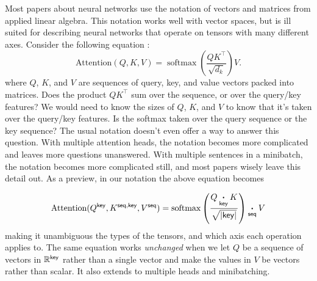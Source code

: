 \documentclass{article}
\DeclareMathOperator*{\softmax}{softmax}
\begin{document}
Most papers about neural networks use the notation of vectors and matrices from applied linear algebra.  This notation works well with vector spaces, but is ill suited for describing neural networks that operate on tensors with many different axes. Consider the following equation \citep{vaswani+:2017}:
\begin{equation}
  \text{Attention}(Q, K, V) = \softmax \left( \frac{QK^\top}{\sqrt{d_k}} \right) V. 
  \label{eq:attention-naive}
\end{equation} 
where $Q$, $K$, and $V$ are sequences of query, key, and value vectors packed into matrices. Does the product $QK^\top$ sum over the sequence, or over the query/key features? We would need to know the sizes of $Q$, $K$, and $V$ to know that it's taken over the query/key features. Is the softmax taken over the query sequence or the key sequence? The usual notation doesn't even offer a way to answer this question. With multiple attention heads, the notation becomes more complicated and leaves more questions unanswered. With multiple sentences in a minibatch, the notation becomes more complicated still, and most papers wisely leave this detail out.
As a preview, in our notation the above equation becomes

\begin{equation}
  \text{Attention}(Q^{\mathsf{key}},K^{\mathsf{seq},\mathsf{key}},V^{\mathsf{seq}}) = \mathop{\text{softmax}}\limits_{\mathsf{}} \left( \frac{Q \mathbin{\mathop{\boldsymbol\cdot}\limits_{\mathsf{key}}} K}{\sqrt{|\mathsf{key}|}} \right) \mathbin{\mathop{\boldsymbol\cdot}\limits_{\mathsf{seq}}} V  
\label{eq:attention-new}
\end{equation}
making it unambiguous the types of the tensors, and which axis each operation applies to. The same equation works \emph{unchanged} when we let $Q$ be a sequence of vectors in $\mathbb{R}^{\mathsf{key}}$ rather than a single vector and make the values in $V$ be vectors rather than scalar. It also extends to multiple heads and minibatching. 
\end{document}
